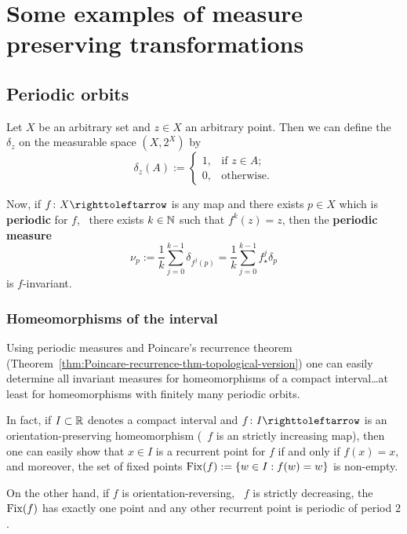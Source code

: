 \section{Some examples of measure preserving transformations}\label{sec:examples-measure-pres-trans}

\subsection{Periodic orbits}\label{sec:examples-inv-meas-periodic-orbits}

Let $X$ be an arbitrary set and $z\in X$ an arbitrary point. Then we can define the $\delta_{z}$ on the measurable space $(X,2^{X})$ by
\begin{displaymath}
  \delta_{z}(A):=
  \begin{cases}
    1, &\text{if } z\in A;\\
    0, &\text{otherwise.}
  \end{cases}
\end{displaymath}


Now, if $f\colon X\carr$ is any map and there exists $p\in X$ which is \textbf{periodic} for $f$, \ie~there exists $k\in\mathbb{N}$ such that $f^{k}(z)=z$, then the \textbf{periodic measure}
\begin{displaymath}
  \nu_{p}:=\frac{1}{k}\sum_{j=0}^{k-1}\delta_{f^{j}(p)} = \frac{1}{k}\sum_{j=0}^{k-1} f_{\star}^{j}\delta_{p}
\end{displaymath}
is $f$-invariant.

\subsubsection{Homeomorphisms of the interval}\label{sec:homeos-interval}

Using periodic measures and Poincare's recurrence theorem (Theorem~\ref{thm:Poincare-recurrence-thm-topological-version}) one can easily determine all invariant measures for homeomorphisms of a compact interval\ldots at least for homeomorphisms with finitely many periodic orbits.

In fact, if $I\subset\mathbb{R}$ denotes a compact interval and $f\colon I\carr$ is an orientation-preserving homeomorphism (\ie~$f$ is an strictly increasing map), then one can easily show that $x\in I$ is a recurrent point for $f$ if and only if $f(x)=x$, and moreover, the set of fixed points $\operatorname{Fix}(f):=\{w\in I : f(w)=w\}$ is non-empty.

On the other hand, if $f$ is orientation-reversing, \ie~$f$ is strictly decreasing, the $\operatorname{Fix}(f)$ has exactly one point and any other recurrent point is periodic of period $2$.

